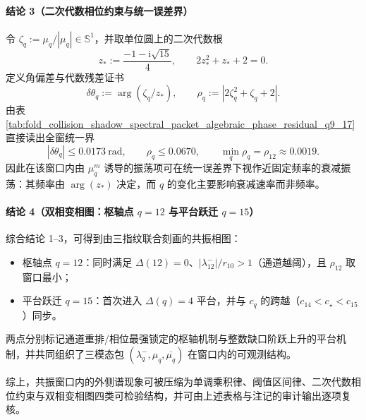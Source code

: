\begin{remark}
\paragraph{结论 3（二次代数相位约束与统一误差界）}
令 \(\zeta_q:=\mu_q/|\mu_q|\in\mathbb{S}^1\)，并取单位圆上的二次代数根
\[
z_\ast:=\frac{-1-\mathrm{i}\sqrt{15}}{4},
\qquad
2z_\ast^{2}+z_\ast+2=0.
\]
定义角偏差与代数残差证书
\[
\delta\theta_q:=\arg(\zeta_q/z_\ast),
\qquad
\rho_q:=|2\zeta_q^2+\zeta_q+2|.
\]
由表 \ref{tab:fold_collision_shadow_spectral_packet_algebraic_phase_residual_q9_17} 直接读出全窗统一界
\[
|\delta\theta_q|\le 0.0173\ \mathrm{rad},
\qquad
\rho_q\le 0.0670,
\qquad
\min_q\rho_q=\rho_{12}\approx 0.0019.
\]
因此在该窗口内由 \(\mu_q^m\) 诱导的振荡项可在统一误差界下视作近固定频率的衰减振荡：其频率由 \(\arg(z_\ast)\) 决定，而 \(q\) 的变化主要影响衰减速率而非频率。
\par

\paragraph{结论 4（双相变相图：枢轴点 \(q=12\) 与平台跃迁 \(q=15\)）}
综合结论 1--3，可得到由三指纹联合刻画的共振相图：
\begin{itemize}
\item 枢轴点 \(q=12\)：同时满足 \(\Delta(12)=0\)、\(|\lambda_{12}^-|/r_{10}>1\)（通道越阈），且 \(\rho_{12}\) 取窗口最小；
\item 平台跃迁 \(q=15\)：首次进入 \(\Delta(q)=4\) 平台，并与 \(c_q\) 的跨越（\(c_{14}<c_\star<c_{15}\)）同步。
\end{itemize}
两点分别标记通道重排/相位最强锁定的枢轴机制与整数缺口阶跃上升的平台机制，并共同组织了三模态包 \((\lambda_q^-,\mu_q,\overline{\mu_q})\) 在窗口内的可观测结构。
\par
综上，共振窗口内的外侧谱现象可被压缩为单调乘积律、阈值区间律、二次代数相位约束与双相变相图四类可检验结构，并可由上述表格与注记的审计输出逐项复核。
\end{remark}
